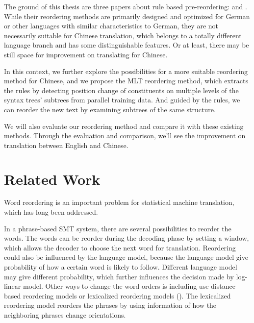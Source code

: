The ground of this thesis are three papers about rule based pre-reordering: \cite{short, long} and \cite{tree}. While their reordering methods are primarily designed and optimized for German or other languages with similar characteristics to German, they are not necessarily suitable for Chinese translation, which belongs to a totally different language branch and has some distinguishable features. Or at least, there may be still space for improvement on translating for Chinese.

In this context, we further explore the possibilities for a more suitable reordering method for Chinese, and we propose the MLT reordering method, which extracts the rules by detecting position change of constituents on multiple levels of the syntax trees' subtrees from parallel training data. And guided by the rules, we can reorder the new text by examining subtrees of the same structure.

We will also evaluate our reordering method and compare it with these existing methods. Through the evaluation and comparison, we'll see the improvement on translation between English and Chinese. 




\section{Related Work}
\label{ch:Introduction:sec:RelatedWork}

Word reordering is an important problem for statistical machine translation, which has long been addressed.

In a phrase-based SMT system, there are several possibilities to reorder the words. The words can be reorder during the decoding phase by setting a window, which allows the decoder to choose the next word for translation. Reordering could also be influenced by the language model, because the language model give probability of how a certain word is likely to follow. Different language model may give different probability, which further influences the decision made by log-linear model. Other ways to change the word orders is including use distance based reordering models or lexicalized reordering models (\cite{tillmann2004, koehn2005}). The lexicalized reordering model reorders the phrases by using information of how the neighboring phrases change orientations.

